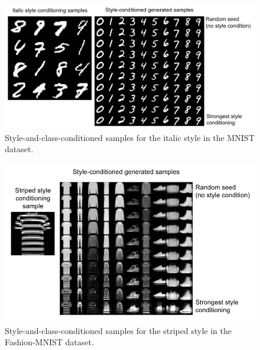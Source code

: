 \begin{figure}[h!]
    \vskip -0.1in 
    \centering
    \caption{\label{fig:italic_conditioned_generated_samples} Style-and-class-conditioned samples for the italic style in the MNIST dataset.}
    \vspace{-0.1in}
    \includegraphics[width=0.78\columnwidth]{fig_datasynth/italic_conditioned_generated_samples.png} 
\end{figure}

\begin{figure}[h!]
    \vskip -0.1in 
    \centering
    \caption{\label{fig:striped_conditioned_generated_samples} Style-and-class-conditioned samples for the striped style in the Fashion-MNIST dataset.}
    \vspace{-0.1in}
    \includegraphics[width=0.78\columnwidth]{fig_datasynth/striped_conditioned_generated_samples.png} 
\end{figure}



